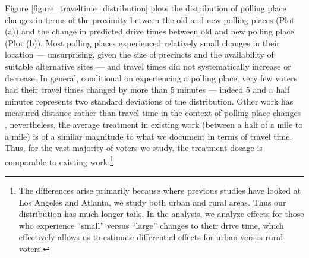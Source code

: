 \documentclass{cup_PSRM}
\begin{document}
Figure \ref{figure_traveltime_distribution} plots the distribution of polling place changes in terms of the proximity between the old and new polling places (Plot (a)) and the change in predicted drive times between old and new polling place (Plot (b)).  Most polling places experienced relatively small changes in their location --- unsurprising, given the size of precincts and the availability of suitable alternative sites --- and travel times did not systematically increase or decrease.  In general, conditional on experiencing a polling place, very few voters had their travel times changed by more than 5 minutes --- indeed 5 and a half minutes represents two standard deviations of the distribution.  Other work has measured distance rather than travel time in the context of polling place changes \citep{brady2011turning,haspel2005location}, nevertheless, the average treatment in existing work (between a half of a mile to a mile) is of a similar magnitude to what we document in terms of travel time.  Thus, for the vast majority of voters we study, the treatment dosage is comparable to existing work.\footnote{The differences arise primarily because where previous studies have looked at Los Angeles and Atlanta, we study both urban and rural areas.  Thus our distribution has much longer tails.  In the analysis, we analyze effects for those who experience ``small'' versus ``large'' changes to their drive time, which effectively allows us to estimate differential effects for urban versus rural voters.}
\end{document}
